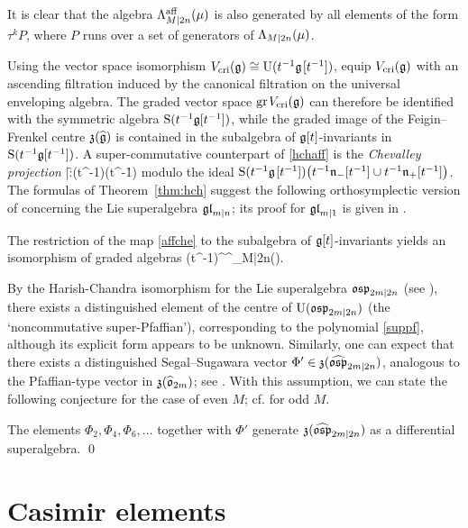 \documentclass[12pt]{article}
\begin{document}
It is clear that the algebra $\Lambda^{{\rm aff}}_{M|2n}(\mu)$ is also generated by
all elements of the form $\tau^k P$, where $P$ runs over a set of generators of $\Lambda_{M|2n}(\mu)$.

Using the vector space isomorphism
$V_{{\rm cri}}(\mathfrak{g})\cong{\rm U}(t^{-1}\mathfrak{g}\hspace{1pt}[t^{-1}])$,
equip $V_{{\rm cri}}(\mathfrak{g})$ with an ascending filtration induced by
the canonical filtration on the universal enveloping algebra.
The graded vector space ${\rm gr}\hspace{1pt} V_{{\rm cri}}(\mathfrak{g})$ can therefore be identified
with the symmetric algebra ${\rm S}(t^{-1}\mathfrak{g}[t^{-1}])$, while
the graded image of the Feigin--Frenkel centre $\mathfrak{z}(\widehat{\mathfrak{g}})$ is contained in the subalgebra
of $\mathfrak{g}[t]$-invariants in ${\rm S}(t^{-1}\mathfrak{g}[t^{-1}])$.
A super-commutative counterpart of \eqref{hchaff} is
the {\em Chevalley projection}
\bar\f:\Sr(t^{-1}\g\tss[t^{-1}])\to \Sr(t^{-1}\h\tss[t^{-1}])
\eeq
modulo the ideal ${\rm S}(t^{-1}\mathfrak{g}\hspace{1pt}[t^{-1}])\big(t^{-1}\mathfrak n_-[t^{-1}]\cup t^{-1}\mathfrak n_+[t^{-1}]\big)$.
The formulas of Theorem~\ref{thm:hch} suggest the following
orthosymplectic version of
\cite[Conjecture~4.3]{mm:iv} concerning the Lie superalgebra $\mathfrak{gl}_{m|n}$;
its proof for $\mathfrak{gl}_{m|1}$ is given in \cite{afn:ca}.

\bcj\label{conj:chevalleyosp}
The restriction of the map \eqref{affche} to the subalgebra of $\mathfrak{g}[t]$-invariants
yields an isomorphism of graded algebras
\ben
\Sr\big(t^{-1}\g[t^{-1}]\big)^{\g[t]}\cong \La^{\aff}_{M|2n}(\mu).
\een
\ecj

By the Harish-Chandra isomorphism for the Lie superalgebra $\mathfrak{osp}_{2m|2n}$
(see \cite[Sec.~2.2]{cw:dr}), there exists a distinguished element
of the centre of ${\rm U}(\mathfrak{osp}_{2m|2n})$
(the `noncommutative super-Pfaffian'),
corresponding to the polynomial
\eqref{suppf}, although its explicit form appears to be unknown.
Similarly, one can expect that there exists a distinguished Segal--Sugawara vector
$\Phi'\in\mathfrak{z}(\widehat{\mathfrak{osp}}_{2m|2n})$, analogous to the Pfaffian-type vector in $\mathfrak{z}(\widehat{\mathfrak{o}}_{2m})$;
see \cite[Sec.~8.1]{m:so}. With this assumption, we can state the following conjecture
for the case of even $M$; cf. \cite[Conjecture~2.3]{mn:ss} for odd $M$.

\bcj\label{conj:even}
The elements $\Phi^{}_{2}, \Phi^{}_{4}, \Phi^{}_{6},\dots$ together with $\Phi'$
generate $\mathfrak{z}(\widehat{\mathfrak{osp}}_{2m|2n})$ as a differential superalgebra.
\qed
\ecj


\section{Casimir elements}
\label{sec:ce}
\end{document}
